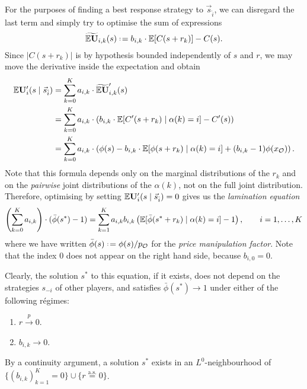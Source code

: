 For the purposes of finding a best response strategy to $\vec{s}_{\hat{i}}$, we can disregard the last term and simply try to optimise the sum of expressions 
\begin{equation}
  \widetilde{\Expectation\Utility}_{i,k}(s) \defeq b_{i,k}\cdot \Expectation[C(s+r_k)] - C(s).
\end{equation}
Since $|C(s+r_k)|$ is by hypothesis bounded independently of $s$ and $r$, we may move the derivative inside the expectation and obtain 
\begin{align}
  \mathbb{E}\mathbf{U}'_i(s\mid\vec{s}_{\hat{i}}) &= \sum_{k=0}^K a_{i,k} \cdot\widetilde{\mathbb{E}\mathbf{U}}'_{i,k}(s) \\
  &= \sum_{k=0}^K a_{i,k} \cdot\left( b_{i,k}\cdot \mathbb{E}[C'(s+r_k)\mid \alpha(k)=i] - C'(s) \right) \\
  \label{expected-utility-final} 
  &= \sum_{k=0}^K a_{i,k} \cdot\left(\phi(s) - b_{i,k}\cdot \mathbb{E}[\phi(s+r_k)\mid \alpha(k)=i] + (b_{i,k}-1)\phi(x_{\mathcal{O}})\right). 
\end{align}
Note that this formula depends only on the marginal distributions of the $r_k$ and on the \emph{pairwise} joint distributions of the $\alpha(k)$, not on the full joint distribution.
%
Therefore, optimising by setting $\mathbb{E}\mathbf{U}'_i(s\mid\vec{s}_{\hat{i}})=0$ gives us the \emph{lamination equation }
\begin{equation} \label{lamination-equation}
  \left(\sum_{k=0}^K a_{i,k}\right) \cdot (\bar{\phi}(s^*) - 1) = \sum_{k=1}^K a_{i,k}b_{i,k}\left(\mathbb{E}[\bar{\phi}(s^*+r_k)\mid \alpha(k)=i] - 1  \right), \qquad i=1,\ldots,K
\end{equation}
where we have written $\bar{\phi}(s)\defeq \phi(s)/ p_\oracle$ for the \emph{price manipulation factor}.
%
Note that the index $0$ does not appear on the right hand side, because $b_{i,0}=0$.

Clearly, the solution $s^*$ to this equation, if it exists, does not depend on the strategies $s_{-i}$ of other players, and satisfies $\bar\phi(s^*) \rightarrow 1$ under either of the following r\'egimes:
\begin{enumerate}
  \item $r\stackrel{p}{\rightarrow} 0$.
  \item $b_{i,k}\rightarrow 0$.
\end{enumerate}
By a continuity argument, a solution ${s^*}$ exists in an $L^0$-neighbourhood of $\{(b_{i,k})_{k=1}^K=0\}\cup\{r \stackrel{\mathrm{a.s.}}{=} 0\}$.

